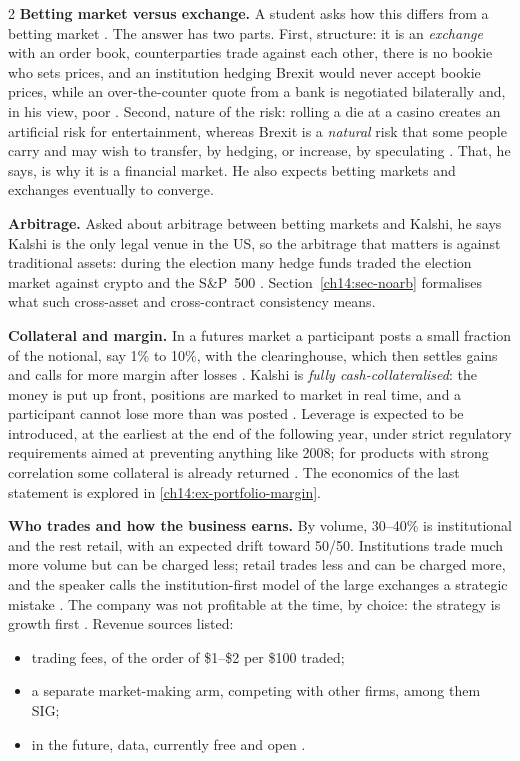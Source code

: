 \begin{paracol}{2}
\textbf{Betting market versus exchange.} A student asks how this differs from a betting market
. The answer has two parts. First, structure: it is an \emph{exchange} with an order book,
counterparties trade against each other, there is no bookie who sets prices, and an institution hedging
Brexit would never accept bookie prices, while an over-the-counter quote from a bank is negotiated bilaterally
and, in his view, poor . Second, nature of the risk: rolling a die at a casino
creates an artificial risk for entertainment, whereas Brexit is a \emph{natural} risk that some people carry
and may wish to transfer, by hedging, or increase, by speculating . That,
he says, is why it is a financial market. He also expects betting markets and exchanges eventually to converge.

\textbf{Arbitrage.} Asked about arbitrage between betting markets and Kalshi, he says Kalshi is the only
legal venue in the US, so the arbitrage that matters is against traditional assets: during the election many
hedge funds traded the election market against crypto and the S\&P~500 . Section~\ref{ch14:sec-noarb}
formalises what such cross-asset and cross-contract consistency means.

\textbf{Collateral and margin.} In a futures market a participant posts a small fraction of the notional, say
1\% to 10\%, with the clearinghouse, which then settles gains and calls for more margin after losses
. Kalshi is \emph{fully cash-collateralised}: the money is put up front, positions are marked to market
in real time, and a participant cannot lose more than was posted . Leverage
is expected to be introduced, at the earliest at the end of the following year, under strict regulatory
requirements aimed at preventing anything like 2008; for products with strong correlation some collateral is
already returned . The economics of the last statement is explored in
\cref{ch14:ex-portfolio-margin}.

\textbf{Who trades and how the business earns.} By volume, 30--40\% is institutional and the rest retail, with an
expected drift toward 50/50. Institutions trade much more volume but can be charged less; retail trades less
and can be charged more, and the speaker calls the institution-first model of the large exchanges a strategic
mistake . The company was not profitable at the time, by choice: the
strategy is growth first . Revenue sources listed:
\begin{itemize}
  \item trading fees, of the order of
      \$1--\$2 per \$100 traded;
  \item a separate market-making arm, competing with other firms, among them SIG;
  \item in the future, data, currently free and open .
\end{itemize}


\end{paracol}
